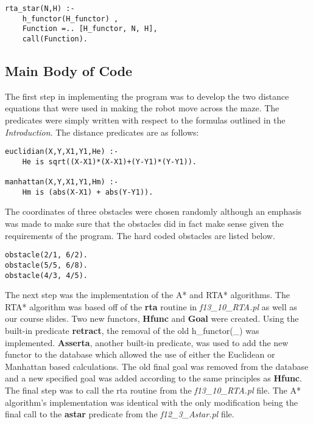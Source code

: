 \documentclass[11pt]{article}
\newcommand{\forceindent}{\leavevmode{\parindent=1em\indent}}
\begin{document}
\begin{lstlisting}
rta_star(N,H) :-
    h_functor(H_functor) , 
    Function =.. [H_functor, N, H],
    call(Function).	
\end{lstlisting}

\subsection{Main Body of Code}
\forceindent The first step in implementing the program was to develop the two distance equations that were used in making the robot move across the maze. The predicates were simply written with respect to the formulas outlined in the \emph{Introduction}. The distance predicates are as follows:
\begin{lstlisting}
euclidian(X,Y,X1,Y1,He) :-
    He is sqrt((X-X1)*(X-X1)+(Y-Y1)*(Y-Y1)).

manhattan(X,Y,X1,Y1,Hm) :-
    Hm is (abs(X-X1) + abs(Y-Y1)).
\end{lstlisting}
\vspace{2 mm}
\forceindent The coordinates of three obstacles were chosen randomly although an emphasis was made to make sure that the obstacles did in fact make sense given the requirements of the program. The hard coded obstacles are listed below.
\begin{lstlisting} 
obstacle(2/1, 6/2).
obstacle(5/5, 6/8).
obstacle(4/3, 4/5).
\end{lstlisting}
\vspace{2 mm}
\forceindent The next step was the implementation of the A* and RTA* algorithms. The RTA* algorithm was based off of the \textbf{rta} routine in \emph{f13\_10\_RTA.pl} as well as our course slides. Two new functors, \textbf{Hfunc} and \textbf{Goal} were created. Using the built-in predicate \textbf{retract}, the removal of the old h\_functor(\_) was implemented. \textbf{Asserta}, another built-in predicate, was used to add the new functor to the database which allowed the use of either the Euclidean or Manhattan based calculations. The old final goal was removed from the database and a new specified goal was added according to the same principles as \textbf{Hfunc}. The final step was to call the rta routine from the \emph{f13\_10\_RTA.pl} file. The A*  algorithm's implementation was identical with the only modification being the final call to the \textbf{astar} predicate from the \emph{f12\_3\_Astar.pl} file. \\
\end{document}

